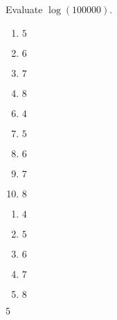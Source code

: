 







 Evaluate $\log(100000)$.


\ifsat
	\begin{enumerate}[label=\Alph*)]
		\item  $5$%
		\item  $6$
		\item  $7$
		\item  $8$
	\end{enumerate}
\else
\fi

\ifacteven
	\begin{enumerate}[label=\textbf{\Alph*.},itemsep=\fill,align=left]
		\setcounter{enumii}{5}
		\item   $4$
		\item  $5$%
		\item  $6$
		\addtocounter{enumii}{1}
		\item  $7$
		\item  $8$
	\end{enumerate}
\else
\fi

\ifactodd
	\begin{enumerate}[label=\textbf{\Alph*.},itemsep=\fill,align=left]
		\item   $4$
		\item  $5$%
		\item  $6$
		\item  $7$
		\item  $8$
	\end{enumerate}
\else
\fi

\ifgridin
  $5$%
		
\else
\fi

